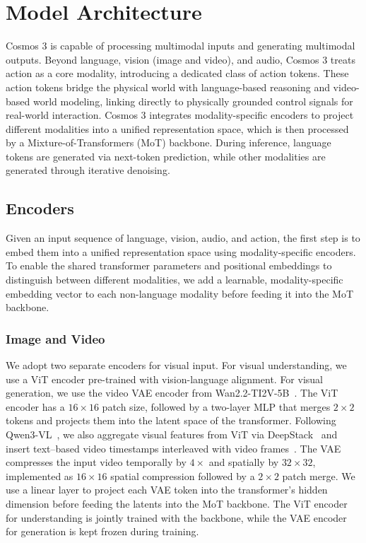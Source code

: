 \documentclass{llmxive}
\begin{document}
\section{Model Architecture}
\label{sec::model}

Cosmos 3 is capable of processing multimodal inputs and generating multimodal outputs. Beyond language, vision (image and video), and audio, Cosmos 3 treats action as a core modality, introducing a dedicated class of action tokens. These action tokens bridge the physical world with language-based reasoning and video-based world modeling, linking directly to physically grounded control signals for real-world interaction. Cosmos 3 integrates modality-specific encoders to project different modalities into a unified representation space, which is then processed by a Mixture-of-Transformers (MoT) backbone. During inference, language tokens are generated via next-token prediction, while other modalities are generated through iterative denoising.

\subsection{Encoders}
Given an input sequence of language, vision, audio, and action, the first step is to embed them into a unified representation space using modality-specific encoders. To enable the shared transformer parameters and positional embeddings to distinguish between different modalities, we add a learnable, modality-specific embedding vector to each non-language modality before feeding it into the MoT backbone.

\subsubsection{Image and Video}
We adopt two separate encoders for visual input. For visual understanding, we use a ViT encoder pre-trained with vision-language alignment. For visual generation, we use the video VAE encoder from Wan2.2-TI2V-5B~\citep{wan2025}. The ViT encoder has a $16\times16$ patch size, followed by a two-layer MLP that merges $2\times2$ tokens and projects them into the latent space of the transformer. Following Qwen3-VL~\citep{qwen3vl2025}, we also aggregate visual features from ViT via DeepStack~\citep{meng2024deepstack} and insert text–based video timestamps interleaved with video frames~\citep{chen2024timemarker}. The VAE compresses the input video temporally by $4\times$ and spatially by $32\times32$, implemented as $16\times16$ spatial compression followed by a $2\times2$ patch merge. We use a linear layer to project each VAE token into the transformer's hidden dimension before feeding the latents into the MoT backbone. The ViT encoder for understanding is jointly trained with the backbone, while the VAE encoder for generation is kept frozen during training.
\end{document}
